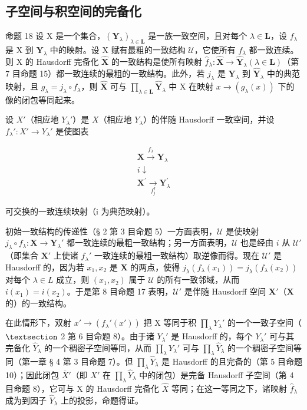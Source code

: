\subsection{子空间与积空间的完备化}

命题 18 设 X 是一个集合，\((\mathbf{Y}_{\lambda})_{\lambda \in \mathbf{L}}\) 是一族一致空间，且对每个 \(\lambda \in \mathbf{L}\)，设 \(f_{\lambda}\) 是 X 到 \(\mathbf{Y}_{\lambda}\) 中的映射。设 X 赋有最粗的一致结构 \(\mathcal{U}\)，它使所有 \(f_{\lambda}\) 都一致连续。则 X 的 Hausdorff 完备化 \(\hat{\mathbf{X}}\) 的一致结构是使所有映射 \(\hat{f}_{\lambda} \colon \hat{\mathbf{X}} \to \hat{\mathbf{Y}}_{\lambda} (\lambda \in \mathbf{L})\)（第 7 目命题 15）都一致连续的最粗的一致结构。此外，若 \(j_{\lambda}\) 是 \(\mathbf{Y}_{\lambda}\) 到 \(\hat{\mathbf{Y}}_{\lambda}\) 中的典范映射，且 \(g_{\lambda} = j_{\lambda} \circ f_{\lambda}\)，则 \(\hat{\mathbf{X}}\) 可与 \(\prod_{\lambda \in \mathbf{L}} \hat{\mathbf{Y}}_{\lambda}\) 中 X 在映射 \(x \to (g_{\lambda}(x))\) 下的像的闭包等同起来。

设 \(X'\)（相应地 \(Y_{\lambda}'\)）是 \(X\)（相应地 \(Y_{\lambda}\)）的伴随 Hausdorff 一致空间，并设 \(f_{\lambda}' \colon X' \to Y_{\lambda}'\) 是使图表

\[
\begin{array}{c} \mathbf {X} \xrightarrow {f _ {\lambda}} \mathbf {Y} _ {\lambda} \\ i \downarrow \\ \mathbf {X ^ {\prime}} \xrightarrow [ f _ {j} ^ {I} ]{} \mathbf {Y} _ {\lambda} ^ {\prime} \end{array}
\]

可交换的一致连续映射（i 为典范映射）。

初始一致结构的传递性（§ 2 第 3 目命题 5）一方面表明，\(\mathcal{U}\) 是使映射 \(j_{\lambda} \circ f_{\lambda}: \mathbf{X} \to \mathbf{Y}_{\lambda}'\) 都一致连续的最粗一致结构；另一方面表明，\(\mathcal{U}\) 也是经由 \(i\) 从 \(\mathcal{U}'\)（即集合 \(\mathbf{X}'\) 上使诸 \(f_{\lambda}'\) 一致连续的最粗一致结构）取逆像而得。现在 \(\mathcal{U}'\) 是 Hausdorff 的，因为若 \(x_{1}, x_{2}\) 是 \(\mathbf{X}\) 的两点，使得 \(j_{\lambda}(f_{\lambda}(x_{1})) = j_{\lambda}(f_{\lambda}(x_{2}))\) 对每个 \(\lambda \in L\) 成立，则 \((x_{1}, x_{2})\) 属于 \(\mathcal{U}\) 的所有一致邻域，从而 \(i(x_{1}) = i(x_{2})\)。于是第 8 目命题 17 表明，\(\mathcal{U}'\) 是伴随 Hausdorff 空间 \(\mathbf{X}'\)（\(\mathbf{X}\) 的）的一致结构。

在此情形下，双射 \(x' \to (f_{\lambda}'(x'))\) 把 X 等同于积 \(\prod_{\lambda} Y_{\lambda}'\) 的一个一致子空间（ \(\S\) 2 第 6 目命题 8）。由于诸 \(Y_{\lambda}'\) 是 Hausdorff 的，每个 \(Y_{\lambda}'\) 可与其完备化 \(\hat{Y}_{\lambda}\) 的一个稠密子空间等同，从而 \(\prod_{\lambda} Y_{\lambda}'\) 可与 \(\prod_{\lambda} \hat{Y}_{\lambda}\) 的一个稠密子空间等同（第一章 § 4 第 3 目命题 7）。但 \(\prod_{\lambda} \hat{Y}_{\lambda}\) 是 Hausdorff 的且完备的（第 5 目命题 10）；因此闭包 \(\overline{X}'\)（即 \(X'\) 在 \(\prod_{\lambda} \hat{Y}_{\lambda}\) 中的闭包）是完备 Hausdorff 子空间（第 4 目命题 8），它可与 X 的 Hausdorff 完备化 \(\hat{X}\) 等同；在这一等同之下，诸映射 \(\hat{f}_{\lambda}\) 成为到因子 \(\hat{Y}_{\lambda}\) 上的投影，命题得证。

